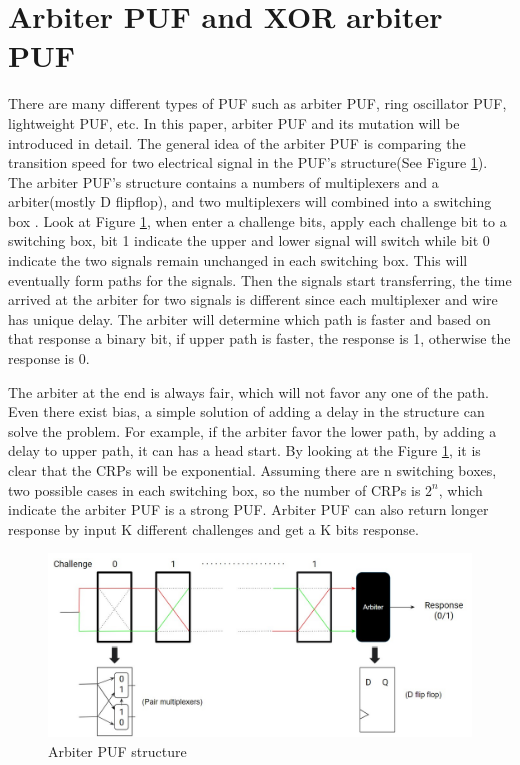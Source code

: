 \section{Arbiter PUF and XOR arbiter PUF}
There are many different types of PUF such as arbiter PUF, ring oscillator PUF, lightweight PUF, etc. In this paper, arbiter PUF and its mutation will be introduced in detail. The general idea of
the arbiter PUF is comparing the transition speed for two electrical signal in the PUF's structure(See Figure \ref{fig:figure6}). The arbiter PUF's structure contains a numbers of 
multiplexers and a arbiter(mostly D flipflop), and two multiplexers will combined into a switching box \cite{Reference3}. Look at Figure \ref{fig:figure6}, when enter a challenge bits, apply each challenge bit to a switching box, bit 1 indicate the upper and lower signal will switch 
while bit 0 indicate the two signals remain unchanged in each switching box. This will eventually form paths for the signals. Then the signals start transferring, the time arrived at the arbiter for two signals 
is different since each multiplexer and wire has unique delay. The arbiter will determine which path is faster and based on that response a binary bit, if upper path is faster, the response is 1, 
otherwise the response is 0. \par

The arbiter at the end is always fair, which will not favor any one of the path. Even there exist bias, a simple solution of adding a delay in the structure can solve the problem. For example, if the arbiter favor the lower path,
by adding a delay to upper path, it can has a head start. By looking at the Figure \ref{fig:figure6}, it is clear that the CRPs will be exponential. Assuming there are n switching boxes, two possible cases in each switching box, so the 
number of CRPs is $2^{n}$, which indicate the arbiter PUF is a strong PUF. Arbiter PUF can also return longer response by input K different challenges and get a K bits response.

\begin{figure}[htp]
    \centering
    \includegraphics[width=12cm]{figures/figure6.jpg}
    \caption{Arbiter PUF structure}
    \label{fig:figure6}
    \end{figure}

